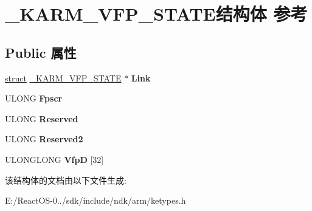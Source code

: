 \hypertarget{struct___k_a_r_m___v_f_p___s_t_a_t_e}{}\section{\+\_\+\+K\+A\+R\+M\+\_\+\+V\+F\+P\+\_\+\+S\+T\+A\+T\+E结构体 参考}
\label{struct___k_a_r_m___v_f_p___s_t_a_t_e}
\subsection*{Public 属性}
\begin{DoxyCompactItemize}
\item 
\mbox{\label{struct___k_a_r_m___v_f_p___s_t_a_t_e_ae0adff38029d36d68775024865efa815}} 
\hyperlink{interfacestruct}{struct} \hyperlink{struct___k_a_r_m___v_f_p___s_t_a_t_e}{\+\_\+\+K\+A\+R\+M\+\_\+\+V\+F\+P\+\_\+\+S\+T\+A\+TE} $\ast$ {\bfseries Link}
\item 
\mbox{\label{struct___k_a_r_m___v_f_p___s_t_a_t_e_a8a296bb73aaa62104d14c5d2bf30b5cd}} 
U\+L\+O\+NG {\bfseries Fpscr}
\item 
\mbox{\label{struct___k_a_r_m___v_f_p___s_t_a_t_e_a0882e4aa0d5dab4f2fa203ca04e0184b}} 
U\+L\+O\+NG {\bfseries Reserved}
\item 
\mbox{\label{struct___k_a_r_m___v_f_p___s_t_a_t_e_ab03aba9a9b7d542bf66cbda6615a49eb}} 
U\+L\+O\+NG {\bfseries Reserved2}
\item 
\mbox{\label{struct___k_a_r_m___v_f_p___s_t_a_t_e_a0ecbe52eec7b3b0748aa772b55c989b8}} 
U\+L\+O\+N\+G\+L\+O\+NG {\bfseries VfpD} \mbox{[}32\mbox{]}
\end{DoxyCompactItemize}


该结构体的文档由以下文件生成\+:\begin{DoxyCompactItemize}
\item 
E\+:/\+React\+O\+S-\/0../sdk/include/ndk/arm/ketypes.\+h\end{DoxyCompactItemize}
